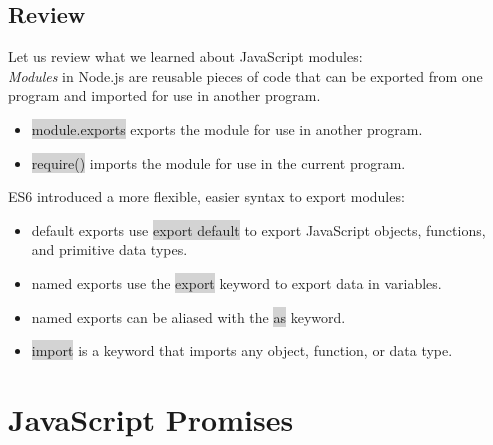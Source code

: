 \documentclass[11pt]{article}
\begin{document}
\subsection{Review}
Let us review what we learned about JavaScript modules: \\
\newline
\textit{Modules} in Node.js are reusable pieces of code that can be exported from one program and imported for use in another program.
\begin{itemize}[leftmargin = *]
\item \colorbox{lightgray}{module.exports} exports the module for use in another program.
\item \colorbox{lightgray}{require()} imports the module for use in the current program.
\end{itemize}
ES6 introduced a more flexible, easier syntax to export modules:
\begin{itemize}[leftmargin = *]
\item default exports use \colorbox{lightgray}{export default} to export JavaScript objects, functions, and primitive data types.
\item named exports use the \colorbox{lightgray}{export} keyword to export data in variables.
\item named exports can be aliased with the \colorbox{lightgray}{as} keyword.
\item \colorbox{lightgray}{import} is a keyword that imports any object, function, or data type.
\end{itemize}

\newpage
\section{JavaScript Promises}
\end{document}
